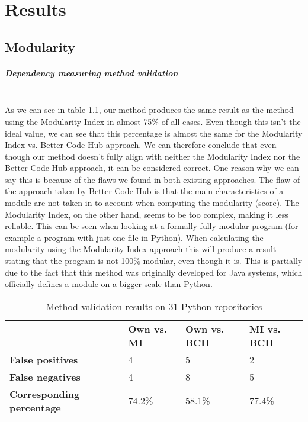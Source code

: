 \documentclass[twoside]{uva-inf-bachelor-thesis}
\newcommand{\myparagraph}[1]{\paragraph{#1}\mbox{}\\}
\begin{document}
\chapter{Results}
\section{Modularity}
\myparagraph{Dependency measuring method validation}
As we can see in table \ref{table:validation}, our method produces the same result as the method using the Modularity Index in almost 75\% of all cases. Even though this isn't the ideal value, we can see that this percentage is almost the same for the Modularity Index vs. Better Code Hub approach. We can therefore conclude that even though our method doesn't fully align with neither the Modularity Index nor the Better Code Hub approach, it can be considered correct. One reason why we can say this is because of the flaws we found in both existing approaches. The flaw of the approach taken by Better Code Hub is that the main characteristics of a module are not taken in to account when computing the modularity (score). The Modularity Index, on the other hand, seems to be too complex, making it less reliable. This can be seen when looking at a formally fully modular program (for example a program with just one file in Python). When calculating the modularity using the Modularity Index approach this will produce a result stating that the program is not 100\% modular, even though it is. This is partially due to the fact that this method was originally developed for Java systems, which officially defines a module on a bigger scale than Python.

\begin{table}[H]
\centering
\caption{Method validation results on 31 Python repositories}
\label{table:validation}
\begin{tabular}{llll}
\textbf{}                         & \textbf{Own vs. MI} & \textbf{Own vs. BCH} & \textbf{MI vs. BCH} \\ 
\textbf{False positives}          & 4                   & 5                    & 2                   \\
\textbf{False negatives}          & 4                   & 8                    & 5                   \\
\textbf{Corresponding percentage} & 74.2\%              & 58.1\%               & 77.4\%             
\end{tabular}
\end{table}
\end{document}
